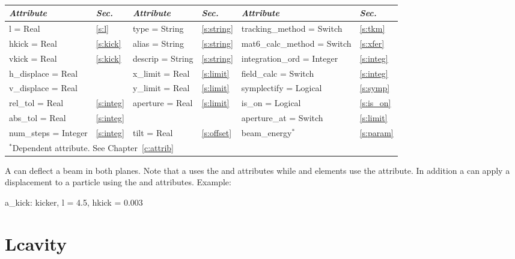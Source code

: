 {{\begin{center}
\tt
\begin{tabular}{|l|l||l|l||l|l|} \hline
  {\sl Attribute} & {\sl Sec.} & {\sl Attribute} & {\sl Sec.}&  {\sl Attribute} & {\sl Sec.} \\ \hline
  l        = Real       & \ref{s:l}       & type = String    & \ref{s:string} & tracking\_method = Switch    & \ref{s:tkm}   \\ \hline
  hkick    = Real       & \ref{s:kick}    & alias = String   & \ref{s:string} & mat6\_calc\_method = Switch  & \ref{s:xfer}  \\ \hline
  vkick    = Real       & \ref{s:kick}    & descrip = String & \ref{s:string} & integration\_ord = Integer   & \ref{s:integ} \\ \hline
  h\_displace = Real    &                 & x\_limit = Real  & \ref{s:limit}  & field\_calc = Switch         & \ref{s:integ} \\ \hline 
  v\_displace = Real    &                 & y\_limit = Real  & \ref{s:limit}  & symplectify = Logical        & \ref{s:symp}  \\ \hline
  rel\_tol = Real       & \ref{s:integ}   & aperture = Real  & \ref{s:limit}  & is\_on = Logical             & \ref{s:is_on} \\ \hline
  abs\_tol = Real       & \ref{s:integ}   &                  &                & aperture\_at = Switch        & \ref{s:limit} \\ \hline
  num\_steps = Integer  & \ref{s:integ}   & tilt     = Real  & \ref{s:offset} & beam\_energy$^*$             & \ref{s:param} \\ \hline
  \multicolumn{6}{l}{\small $^*$Dependent attribute. See Chapter~\ref{c:attrib}} \\
\end{tabular}
\end{center}
\toffset

A  can deflect a beam in both planes. Note that a
 uses the  and  attributes while
 and  elements use the  attribute. 
In addition a  can apply a displacement to a particle
using the  and  attributes.
Example:
\begin{example}
  a_kick: kicker, l = 4.5, hkick = 0.003
\end{example}

\section{Lcavity}
\label{s:lcav}

}}
